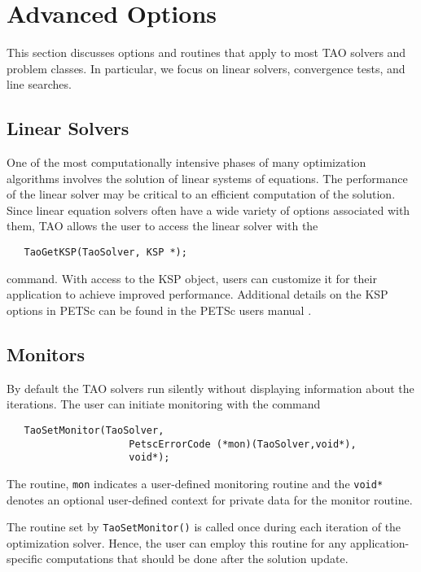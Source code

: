 
\chapter{Advanced Options}

This section discusses options and routines that apply to most TAO
solvers and problem classes.  In particular, we focus on
linear solvers, convergence tests, and line searches.

\section{Linear Solvers}\label{sec:TaoLinearSolvers}
One of the most computationally intensive phases of many optimization
algorithms involves the solution of linear systems of equations.  
The performance of the linear solver may be critical to an efficient 
computation of the solution.  Since linear equation solvers often have 
a wide variety of options associated with them, TAO allows the user to 
access the linear solver with the
\begin{verbatim}
   TaoGetKSP(TaoSolver, KSP *);
\end{verbatim}
command. 
With access to the KSP object, users can customize it for their application
to achieve improved performance. Additional details on the KSP options in
PETSc can be found in the PETSc users manual \cite{petsc-user-ref}.



\section{Monitors}
By default the TAO solvers run silently without displaying information
about the iterations. The user can initiate monitoring with the
command  
\begin{verbatim}
   TaoSetMonitor(TaoSolver,
                     PetscErrorCode (*mon)(TaoSolver,void*),
                     void*);
\end{verbatim}
\noindent
The routine, {\tt mon} indicates a user-defined monitoring routine
and the {\tt void*} denotes an optional user-defined context for private 
data for the monitor routine.

The routine set by {\tt TaoSetMonitor()} is called once during each
iteration of the optimization solver.  Hence, the user can employ this 
routine for any application-specific computations that should be done 
after the solution update. 


